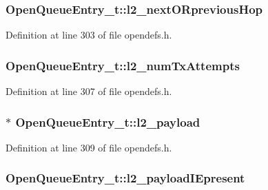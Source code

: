\subsubsection[{\texorpdfstring{l2\+\_\+next\+O\+Rprevious\+Hop}{l2_nextORpreviousHop}}]{ Open\+Queue\+Entry\+\_\+t\+::l2\+\_\+next\+O\+Rprevious\+Hop}\hypertarget{struct_open_queue_entry__t_ab91fcf71e5cbf35372bff7d0f247fc2b}{}\label{struct_open_queue_entry__t_ab91fcf71e5cbf35372bff7d0f247fc2b}


Definition at line 303 of file opendefs.\+h.

\subsubsection[{\texorpdfstring{l2\+\_\+num\+Tx\+Attempts}{l2_numTxAttempts}}]{ Open\+Queue\+Entry\+\_\+t\+::l2\+\_\+num\+Tx\+Attempts}\hypertarget{struct_open_queue_entry__t_a5815fb8278120d97eb5941cfa098fc47}{}\label{struct_open_queue_entry__t_a5815fb8278120d97eb5941cfa098fc47}


Definition at line 307 of file opendefs.\+h.

\subsubsection[{\texorpdfstring{l2\+\_\+payload}{l2_payload}}]{$\ast$ Open\+Queue\+Entry\+\_\+t\+::l2\+\_\+payload}\hypertarget{struct_open_queue_entry__t_a96298b7b0588b0d2e8a570f4e24ba96f}{}\label{struct_open_queue_entry__t_a96298b7b0588b0d2e8a570f4e24ba96f}


Definition at line 309 of file opendefs.\+h.

\subsubsection[{\texorpdfstring{l2\+\_\+payload\+I\+Epresent}{l2_payloadIEpresent}}]{ Open\+Queue\+Entry\+\_\+t\+::l2\+\_\+payload\+I\+Epresent}\hypertarget{struct_open_queue_entry__t_a4a9a9c51b34d37c37af3cd8dba19e1dd}{}\label{struct_open_queue_entry__t_a4a9a9c51b34d37c37af3cd8dba19e1dd}


